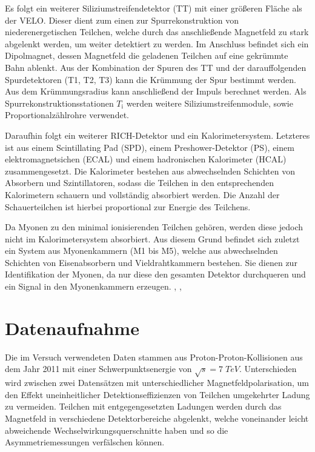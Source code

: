 Es folgt ein weiterer Siliziumstreifendetektor (TT) mit einer größeren Fläche als der VELO. Dieser dient zum einen zur Spurrekonstruktion von niederenergetischen Teilchen, welche durch das anschließende Magnetfeld zu stark abgelenkt werden, um weiter detektiert zu werden. Im Anschluss befindet sich ein Dipolmagnet, dessen Magnetfeld die geladenen Teilchen auf eine gekrümmte Bahn ablenkt. Aus der Kombination der Spuren des TT und der darauffolgenden Spurdetektoren (T1, T2, T3) kann die Krümmung der Spur bestimmt werden.
Aus dem Krümmungsradius kann anschließend der Impuls berechnet werden. Als Spurrekonstruktionsstationen $T_\mathrm{i}$ werden weitere Siliziumstreifenmodule, sowie Proportionalzählrohre verwendet.

Daraufhin folgt ein weiterer RICH-Detektor und ein Kalorimetersystem. Letzteres ist aus einem Scintillating Pad (SPD), einem Preshower-Detektor (PS), einem elektromagnetsichen (ECAL) und einem hadronischen Kalorimeter (HCAL) zusammengesetzt. Die Kalorimeter bestehen aus abwechselnden Schichten von Absorbern und Szintillatoren, sodass die Teilchen in den entsprechenden Kalorimetern schauern und vollständig absorbiert werden. Die Anzahl der Schauerteilchen ist hierbei proportional zur Energie des Teilchens.

Da Myonen zu den minimal ionisierenden Teilchen gehören, werden diese jedoch nicht im Kalorimetersystem absorbiert. Aus diesem Grund befindet sich zuletzt ein System aus Myonenkammern (M1 bis M5), welche aus abwechselnden Schichten von Eisenabsorbern und Vieldrahtkammern bestehen. Sie dienen zur Identifikation der Myonen, da nur diese den gesamten Detektor durchqueren und ein Signal in den Myonenkammern erzeugen. \cite{lhcb}, \cite{lhcbpaper}, \cite{lhcbmachine}

\section{Datenaufnahme}
Die im Versuch verwendeten Daten stammen aus Proton-Proton-Kollisionen aus dem Jahr 2011 mit einer Schwerpunktsenergie von $\sqrt{s}=7\;\si{TeV}$. Unterschieden wird zwischen zwei Datensätzen mit unterschiedlicher Magnetfeldpolarisation, um den Effekt uneinheitlicher Detektionseffizienzen von Teilchen umgekehrter Ladung zu vermeiden. Teilchen mit entgegengesetzten Ladungen werden durch das Magnetfeld in verschiedene Detektorbereiche abgelenkt, welche voneinander leicht abweichende Wechselwirkungsquerschnitte haben und so die Asymmetriemessungen verfälschen können.

